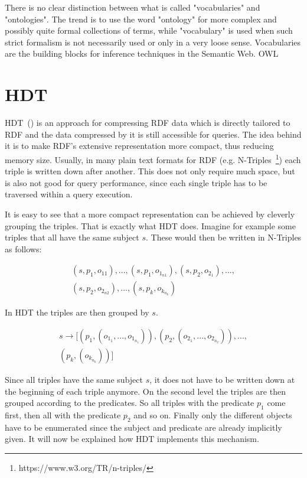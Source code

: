 There is no clear distinction between what is called "vocabularies" and "ontologies". The trend is to use the word "ontology" for more complex and possibly quite formal collections of terms, while "vocabulary" is used when such strict formalism is not necessarily used or only in a very loose sense. Vocabularies are the building blocks for inference techniques in the Semantic Web.
\ac{OWL}

\section{HDT}\label{related_work_hdt}

HDT~(\cite{hdt}) is an approach for compressing RDF data which is directly tailored to RDF and the data compressed by it is still accessible for queries. The idea behind it is to make RDF's extensive representation more compact, thus reducing memory size. Usually, in many plain text formats for RDF (e.g. N-Triples~\footnote{https://www.w3.org/TR/n-triples/}) each triple is written down after another. This does not only require much space, but is also not good for query performance, since each single triple has to be traversed within a query execution.

It is easy to see that a more compact representation can be achieved by cleverly grouping the triples. That is exactly what HDT does. Imagine for example some triples that all have the same subject $s$. These would then be written in N-Triples as follows:

\begin{align*}
(s,p_1,o_{11}),...,(s,p_1,o_{1_{n1}}),(s,p_2,o_{2_1}),...,\\
	(s,p_2,o_{2_{n2}}),...,(s,p_k,o_{k_{n_k}})
\end{align*}

In HDT the triples are then grouped by $s$.

\begin{align*}
s \to [(p_1,(o_{1_1},...,o_{1_{n_1}})),(p_2,(o_{2_1},...,o_{2_{n_2}})),...,\\
 (p_k , (o_{k_{n_k}} ))]
\end{align*}

Since all triples have the same subject $s$, it does not have to be written down at the beginning of each triple anymore. On the second level the triples are then grouped according to the predicates. So all triples with the predicate $p_1$ come first, then all with the predicate $p_2$ and so on. Finally only the different objects have to be enumerated since the subject and predicate are already implicitly given. It will now be explained how HDT implements this mechanism.

